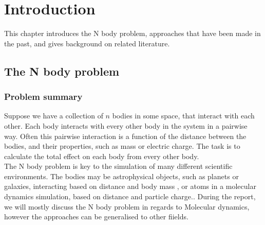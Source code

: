 \documentclass[pdftex,twoside,a4paper]{report}
\newcommand{\pmem}{Particle Mesh Ewald method}
\newcommand{\fma}{Fast Multipole Algorithm}
\begin{document}
\begin{abstract}
The N body problem is common across the fields of physics, biology and chemistry. The classic solution to this problem has an inhibitive complexity in the class $O(n^2)$. Two alternative methods were examined: The Fast Multipole Algorithm, and the Particle Mesh Ewald Method, with better complexities of $O(n)$ and $O(n \text{log}(n))$, respectively. These algorithms were implemented in Java, and their efficiencies were discussed and compared. The algorithms were run over typical molecular dynamics simulations to determine the most efficient algorithm for the N-body problem. It was found that the \fma{} was the most efficient algorithm for this architecture and implementation, but the \pmem{} may be preferable in high perfomance parallel applications. The algorithms and their advantages / disadvantages were discussed in detail.
\end{abstract}

\tableofcontents

\chapter{Introduction}
This chapter introduces the N body problem, approaches that have been made in the past, and gives background on related literature.
\section{The N body problem}
    \subsection{Problem summary}
    Suppose we have a collection of $n$ bodies in some space, that interact with each other. Each body interacts with every other body in the system in a pairwise way. Often this pairwise interaction is a function of the distance between the bodies, and their properties, such as mass or electric charge. The task is to calculate the total effect on each body from every other body.\\
    
    The N body problem is key to the simulation of many different scientific environments. The bodies may be astrophysical objects, such as planets or galaxies, interacting based on distance and body mass \cite{MilleniumRun}, or atoms in a molecular dynamics simulation, based on distance and particle charge.\cite{NAMD}. During the report, we will mostly discuss the N body problem in regards to Molecular dynamics, however the approaches can be generalised to other fiields.
\end{document}
